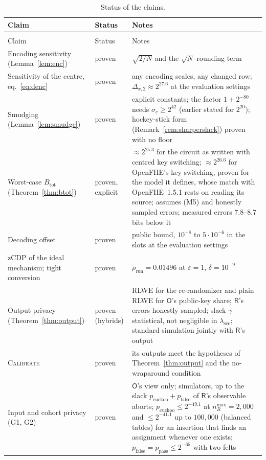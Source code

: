 \documentclass[11pt]{article}
\theoremstyle{definition}
\theoremstyle{plain}
\newcommand{\Party}[1]{\textsf{#1}}
\newcommand{\Rp}{\Party{R}}
\newcommand{\Op}{\Party{O}}
\begin{document}
{\small
\setlength{\LTcapwidth}{\textwidth}
\begin{xltabular}{\textwidth}{@{}>{\raggedright\arraybackslash}p{4.4cm}>{\raggedright\arraybackslash}p{2.6cm}>{\raggedright\arraybackslash}X@{}}
\caption{Status of the claims.}
\label{tab:status}\\
\toprule
Claim & Status & Notes \\
\midrule
\endfirsthead
{} \\
\toprule
Claim & Status & Notes \\
\midrule
\endhead
Encoding sensitivity (Lemma~\ref{lem:enc}) & proven & $\sqrt{2/N}$ and the $\sqrt N$ rounding term \\
Sensitivity of the centre, eq.~\eqref{eq:denc} & proven & any encoding scales, any changed row; $\Delta_{x,2} \approx 2^{27.6}$ at the evaluation settings \\
Smudging (Lemma~\ref{lem:smudge}) & proven & explicit constants; the factor $1 + 2^{-80}$ needs $\sigma_c \ge 2^{42}$ (earlier stated for $2^{20}$); hockey-stick form (Remark~\ref{rem:sharperslack}) proven with no floor \\
Worst-case $B_{\mathrm{tot}}$ (Theorem~\ref{thm:btot}) & proven, explicit & $\approx 2^{25.3}$ for the circuit as written with centred key switching; $\approx 2^{26.6}$ for OpenFHE's key switching, proven for the model it defines, whose match with OpenFHE~1.5.1 rests on reading its source; assumes (M5) and honestly sampled errors; measured errors $7.8$--$8.7$ bits below it \\
Decoding offset & proven & public bound, $10^{-8}$ to $5 \cdot 10^{-6}$ in the slots at the evaluation settings \\
zCDP of the ideal mechanism; tight conversion & proven & $\rho_{\mathrm{run}} = 0.01496$ at $\varepsilon = 1$, $\delta = 10^{-9}$ \\
Output privacy (Theorem~\ref{thm:output}) & proven (hybrids) & RLWE for the re-randomizer and plain RLWE for $\Op$'s public-key share; $\Rp$'s errors honestly sampled; slack $\gamma$ statistical, not negligible in $\lambda_{\mathrm{sec}}$; standard simulation jointly with $\Rp$'s output \\
\textsc{Calibrate} & proven & its outputs meet the hypotheses of Theorem~\ref{thm:output} and the no-wraparound condition \\
Input and cohort privacy (G1, G2) & proven & $\Op$'s view only; simulators, up to the slack $p_{\mathrm{cuckoo}} + p_{\mathrm{false}}$ of $\Rp$'s observable aborts; $p_{\mathrm{cuckoo}} \le 2^{-49.1}$ at $n_R^{\max} = 2{,}000$ and $\le 2^{-41.1}$ up to $100{,}000$ (balanced tables) for an insertion that finds an assignment whenever one exists; $p_{\mathrm{false}} = p_{\mathrm{pass}} \le 2^{-65}$ with two felts \\

\end{xltabular}}
\end{document}

